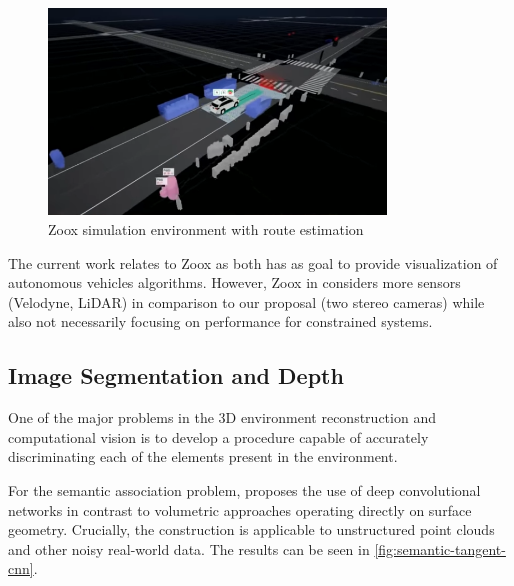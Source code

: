     \begin{figure}[H]
     \caption{\label{fig:zoox-simulation-monitoring}
Zoox simulation environment with route estimation}
     \begin{center}
        \includegraphics[width=0.8\textwidth]{images/zoox-simulation-monitoring.png}
     \end{center}
    \end{figure}
    
    The current work relates to Zoox as both has as goal to provide visualization of autonomous vehicles algorithms. However, Zoox in \cite{zoox-unreal-siggraph-2017} considers more sensors (Velodyne, LiDAR) in comparison to our proposal (two stereo cameras) while also not necessarily focusing on performance for constrained systems.

\subsection{Image Segmentation and Depth}

    One of the major problems in the 3D environment reconstruction and computational vision is to develop a procedure capable of accurately discriminating each of the elements present in the environment.
    
    For the semantic association problem, \cite{semantic_article} proposes the use of deep convolutional networks in contrast to volumetric approaches operating directly on surface geometry. Crucially, the construction is applicable to unstructured point clouds and other noisy real-world data. The results can be seen in \autoref{fig:semantic-tangent-cnn}.

